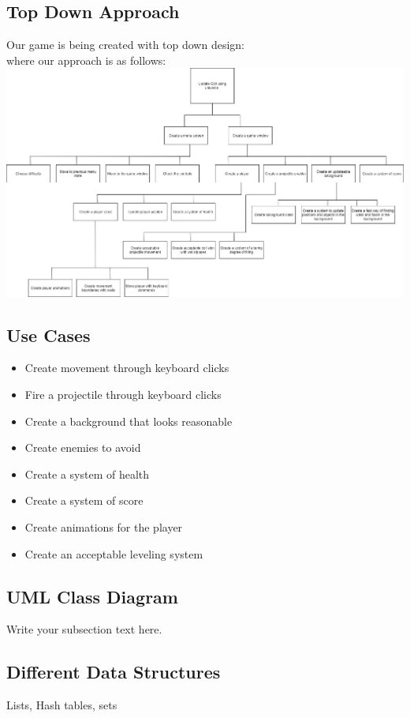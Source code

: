 \documentclass{article}
\begin{document}
	\subsection{Top Down Approach}
	Our game is being created with top down design: \\
	where our approach is as follows: \\
	\includegraphics[scale=0.35]{blah1}
	\subsection{Use Cases}
	\begin{itemize}
		\item Create movement through keyboard clicks
		\item Fire a projectile through keyboard clicks
		\item Create a background that looks reasonable
		\item Create enemies to avoid
		\item Create a system of health
		\item Create a system of score
		\item Create animations for the player
		\item Create an acceptable leveling system
	\end{itemize}
	\subsection{UML Class Diagram}
	Write your subsection text here.
	\subsection{Different Data Structures}
	Lists, Hash tables, sets
\end{document}
